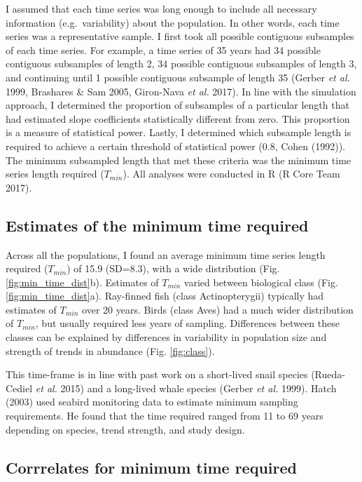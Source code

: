 \documentclass[12pt,]{article}
\begin{document}
I assumed that each time series was long enough to include all necessary
information (e.g.~variability) about the population. In other words,
each time series was a representative sample. I first took all possible
contiguous subsamples of each time series. For example, a time series of
35 years had 34 possible contiguous subsamples of length 2, 34 possible
contiguous subsamples of length 3, and continuing until 1 possible
contiguous subsample of length 35 (Gerber \emph{et al.} 1999, Brashares
\& Sam 2005, Giron-Nava \emph{et al.} 2017). In line with the simulation
approach, I determined the proportion of subsamples of a particular
length that had estimated slope coefficients statistically different
from zero. This proportion is a measure of statistical power. Lastly, I
determined which subsample length is required to achieve a certain
threshold of statistical power (0.8, Cohen (1992)). The minimum
subsampled length that met these criteria was the minimum time series
length required (\(T_{min}\)). All analyses were conducted in R (R Core
Team 2017).

\subsection{Estimates of the minimum time
required}\label{estimates-of-the-minimum-time-required}

Across all the populations, I found an average minimum time series
length required (\(T_{min}\)) of 15.9 (SD=8.3), with a wide distribution
(Fig. \ref{fig:min_time_dist}b). Estimates of \(T_{min}\) varied between
biological class (Fig. \ref{fig:min_time_dist}a). Ray-finned fish (class
Actinopterygii) typically had estimates of \(T_{min}\) over 20 years.
Birds (class Aves) had a much wider distribution of \(T_{min}\), but
usually required less years of sampling. Differences between these
classes can be explained by differences in variability in population
size and strength of trends in abundance (Fig. \ref{fig:class}).

This time-frame is in line with past work on a short-lived snail species
(Rueda-Cediel \emph{et al.} 2015) and a long-lived whale species (Gerber
\emph{et al.} 1999). Hatch (2003) used seabird monitoring data to
estimate minimum sampling requirements. He found that the time required
ranged from 11 to 69 years depending on species, trend strength, and
study design.

\subsection{Corrrelates for minimum time
required}\label{corrrelates-for-minimum-time-required}
\end{document}
